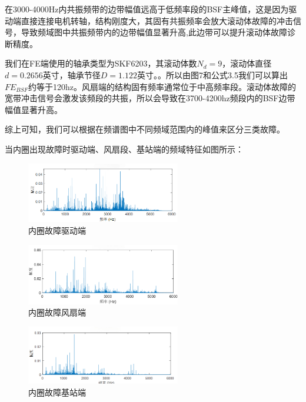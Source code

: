 \documentclass[a4paper]{CPIPC}
\numberwithin{equation}{section}
\begin{document}
在3000-4000Hz内共振频带的边带幅值远高于低频率段的BSF主峰值，这是因为驱动端直接连接电机转轴，结构刚度大，其固有共振频率会放大滚动体故障的冲击信号，导致频域图中共振频带内的边带幅值显著升高,此边带可以提升滚动体故障诊断精度。

我们在FE端使用的轴承类型为SKF6203，其滚动体数${N_d=9}$，滚动体直径${d=0.2656英寸}$，轴承节径${D=1.122英寸}$。。所以由图7和公式3.5我们可以算出$FE_{BSF}$约等于120hz。风扇端的结构固有频率通常位于中高频率段。滚动体故障的宽带冲击信号会激发该频段的共振，所以会导致在3700-4200hz频段内的BSF边带幅值显著升高。

综上可知，我们可以根据在频谱图中不同频域范围内的峰值来区分三类故障。

当内圈出现故障时驱动端、风扇段、基站端的频域特征如图所示：

\begin{figure}[H]
  \centering
  \includegraphics[width=0.6\textwidth]{内圈故障驱动端.png}
  \caption{内圈故障驱动端}
  \label{fig:confidence}
\end{figure}
\begin{figure}[H]
  \centering
  \includegraphics[width=0.6\textwidth]{内圈故障风扇段.png}
  \caption{内圈故障风扇端}
  \label{fig:confidence}
\end{figure}
\begin{figure}[H]
  \centering
  \includegraphics[width=0.6\textwidth]{内圈故障基站端.png}
  \caption{内圈故障基站端}
  \label{fig:confidence}
\end{figure}
\end{document}
